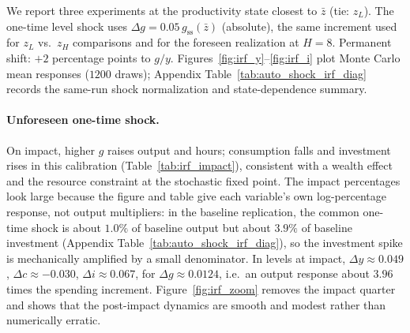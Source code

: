 \documentclass[11pt,a4paper]{article}
\begin{document}
We report three experiments at the productivity state closest to $\bar z$ (tie: $z_L$). The one-time level shock uses $\Delta g = 0.05\,g_{\mathrm{ss}}(\bar z)$ (absolute), the same increment used for $z_L$ vs.\ $z_H$ comparisons and for the foreseen realization at $H=8$. Permanent shift: $+2$ percentage points to $g/y$. Figures~\ref{fig:irf_y}--\ref{fig:irf_i} plot Monte Carlo mean responses ($1200$ draws); Appendix Table~\ref{tab:auto_shock_irf_diag} records the same-run shock normalization and state-dependence summary.


\paragraph{Unforeseen one-time shock.}
On impact, higher $g$ raises output and hours; consumption falls and investment rises in this calibration (Table~\ref{tab:irf_impact}), consistent with a wealth effect and the resource constraint at the stochastic fixed point. The impact percentages look large because the figure and table give each variable's own log-percentage response, not output multipliers: in the baseline replication, the common one-time shock is about $1.0\%$ of baseline output but about $3.9\%$ of baseline investment (Appendix Table~\ref{tab:auto_shock_irf_diag}), so the investment spike is mechanically amplified by a small denominator. In levels at impact, $\Delta y\approx 0.049$, $\Delta c\approx -0.030$, $\Delta i\approx 0.067$, for $\Delta g\approx 0.0124$, i.e.\ an output response about $3.96$ times the spending increment. Figure~\ref{fig:irf_zoom} removes the impact quarter and shows that the post-impact dynamics are smooth and modest rather than numerically erratic.
\end{document}
